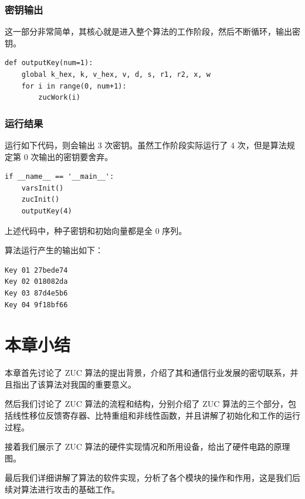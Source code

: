 \subsubsection{密钥输出}

这一部分非常简单，其核心就是进入整个算法的工作阶段，然后不断循环，输出密钥。

\begin{lstlisting}[style=myPython,label={lst:outputkey},caption={算法初始化阶段和工作阶段}]
def outputKey(num=1):
    global k_hex, k, v_hex, v, d, s, r1, r2, x, w
    for i in range(0, num+1):
        zucWork(i)
\end{lstlisting}

\subsubsection{运行结果}
运行如下代码，则会输出 3 次密钥。虽然工作阶段实际运行了 4 次，但是算法规定第 0 次输出的密钥要舍弃。

\begin{lstlisting}[style=myPython,label={lst:run},caption={完整的算法执行过程}]
if __name__ == '__main__':
    varsInit()
    zucInit()
    outputKey(4)
\end{lstlisting}

上述代码中，种子密钥和初始向量都是全 0 序列。

算法运行产生的输出如下：

\begin{lstlisting}[style=myPython,label={lst:runresult},caption={算法运行的输出结果}]
Key 01 27bede74
Key 02 018082da
Key 03 87d4e5b6
Key 04 9f18bf66
\end{lstlisting}

\section{本章小结}

本章首先讨论了 ZUC 算法的提出背景，介绍了其和通信行业发展的密切联系，并且指出了该算法对我国的重要意义。

然后我们讨论了 ZUC 算法的流程和结构，分别介绍了 ZUC 算法的三个部分，包括线性移位反馈寄存器、比特重组和非线性函数，并且讲解了初始化和工作的运行过程。

接着我们展示了 ZUC 算法的硬件实现情况和所用设备，给出了硬件电路的原理图。

最后我们详细讲解了算法的软件实现，分析了各个模块的操作和作用，这是我们后续对算法进行攻击的基础工作。


